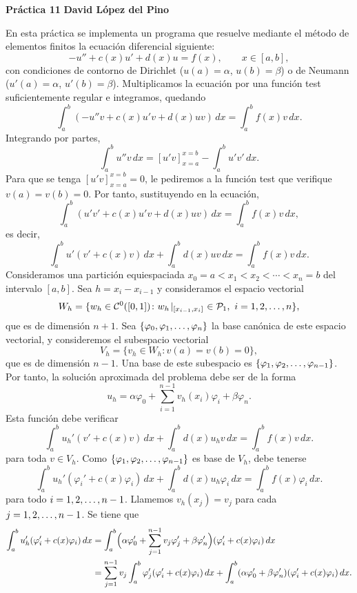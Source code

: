 \documentclass[a4paper, 10pt, oneside]{report}
\begin{document}
\noindent \textbf{Práctica 11} \hfill \textbf{David López del Pino}

\hfill

En esta práctica se implementa un programa que resuelve mediante el método de elementos finitos la ecuación diferencial siguiente:
\[-u''+c(x)u'+d(x)u = f(x), \qquad x \in [a,b],\]
con condiciones de contorno de Dirichlet ($u(a) = \alpha$, $u(b)= \beta$) o de Neumann ($u'(a) = \alpha$, $u'(b)= \beta$). Multiplicamos la ecuación por una función test suficientemente regular e integramos, quedando
\[
    \int_a^b (-u''v+c(x)u'v+d(x)uv) \, dx = \int_a^bf(x)v\, dx.
\]
Integrando por partes,
\[\int_a^b u''v \, dx = [u'v]_{x=a}^{x=b}-\int_a^bu'v'\, dx.\]
Para que se tenga $ [u'v]_{x=a}^{x=b} = 0$, le pediremos a la función test que verifique $v(a) = v(b) = 0$. Por tanto, sustituyendo en la ecuación,
\[\int_a^b (u'v'+c(x)u'v+d(x)uv) \, dx = \int_a^bf(x)v\, dx,\]
es decir,
\[\int_a^b u'(v'+c(x)v)\, dx+\int_a^bd(x)uv \, dx = \int_a^bf(x)v\, dx.\]
Consideramos una partición equiespaciada $x_0 = a < x_1 < x_2 < \cdots < x_{n} = b$ del intervalo $[a,b]$. Sea $h = x_i-x_{i-1}$ y consideramos el espacio vectorial
\[W_h = \{w_h \in \mathcal{C}^0( [0,1]) \colon w_h\!\mid_{[x_{i-1},x_i]} \ \in \mathcal{P}_1, \ i = 1,2,\mathellipsis,n\},\]
que es de dimensión $n+1$. Sea $\{\varphi_0,\varphi_1,\mathellipsis,\varphi_n\}$ la base canónica de este espacio vectorial, y consideremos el subespacio vectorial
\[V_h = \{v_h \in W_h \colon v(a)=v(b)=0\},\]
que es de dimensión $n-1$. Una base de este subespacio es $\{\varphi_1,\varphi_2,\mathellipsis,\varphi_{n-1}\}$. Por tanto, la solución aproximada del problema debe ser de la forma
\[u_h = \alpha \varphi_0 + \sum_{i=1}^{n-1}v_h(x_i)\varphi_i + \beta \varphi_n.\]
Esta función debe verificar
\[\int_a^b u_h'(v'+c(x)v)\, dx+\int_a^bd(x)u_hv \, dx = \int_a^bf(x)v\, dx.\]
para toda $v \in V_h$. Como $\{\varphi_1,\varphi_2,\mathellipsis,\varphi_{n-1}\}$ es base de $V_h$, debe tenerse
\[
    \int_a^b u_h'(\varphi_i'+c(x)\varphi_i)\, dx+\int_a^bd(x)u_h\varphi_i \, dx = \int_a^bf(x)\varphi_i\, dx. \tag{$\ast$}
\]
para todo $i = 1,2,\mathellipsis,n-1$. Llamemos $v_h(x_j) = v_j$ para cada $j = 1,2,\mathellipsis,n-1$. Se tiene que
\begin{align*}
    \int_a^b u'_h(\varphi_i'+c(x)\varphi_i) \, dx &=\int_a^b \Bigl(\alpha\varphi_0'+\sum_{j=1}^{n-1}v_j\varphi_j'+\beta\varphi_n'\Bigr)(\varphi_i'+c(x)\varphi_i) \, dx \\
    &= \sum_{j=1}^{n-1}v_j\int_a^b\varphi_j'(\varphi_i'+c(x)\varphi_i) \, dx +\int_a^b (\alpha\varphi_0'+\beta\varphi_n')(\varphi_i'+c(x)\varphi_i)\, dx.
\end{align*}
\end{document}
